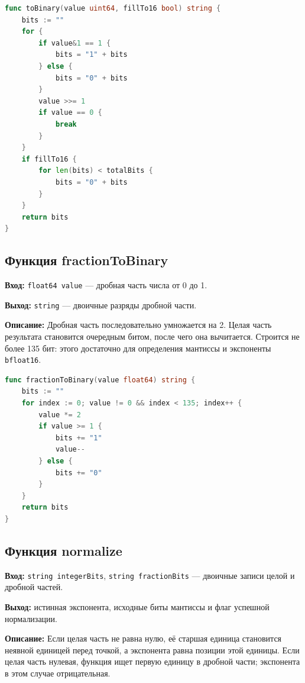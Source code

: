 \begin{lstlisting}[style=common, language=Go, caption=toBinary, label=lst:to-binary]
func toBinary(value uint64, fillTo16 bool) string {
    bits := ""
    for {
        if value&1 == 1 {
            bits = "1" + bits
        } else {
            bits = "0" + bits
        }
        value >>= 1
        if value == 0 {
            break
        }
    }
    if fillTo16 {
        for len(bits) < totalBits {
            bits = "0" + bits
        }
    }
    return bits
}
\end{lstlisting}

\subsection*{Функция fractionToBinary}
\textbf{Вход:} \texttt{float64 value} --- дробная часть числа от 0 до 1. \par
\textbf{Выход:} \texttt{string} --- двоичные разряды дробной части. \par
\textbf{Описание:} Дробная часть последовательно умножается на 2. Целая
часть результата становится очередным битом, после чего она вычитается.
Строится не более 135 бит: этого достаточно для определения мантиссы и
экспоненты \texttt{bfloat16}.

\begin{lstlisting}[style=common, language=Go, caption=fractionToBinary, label=lst:fraction-to-binary]
func fractionToBinary(value float64) string {
    bits := ""
    for index := 0; value != 0 && index < 135; index++ {
        value *= 2
        if value >= 1 {
            bits += "1"
            value--
        } else {
            bits += "0"
        }
    }
    return bits
}
\end{lstlisting}

\subsection*{Функция normalize}
\textbf{Вход:} \texttt{string integerBits}, \texttt{string fractionBits} ---
двоичные записи целой и дробной частей. \par
\textbf{Выход:} истинная экспонента, исходные биты мантиссы и флаг успешной
нормализации. \par
\textbf{Описание:} Если целая часть не равна нулю, её старшая единица становится
неявной единицей перед точкой, а экспонента равна позиции этой единицы.
Если целая часть нулевая, функция ищет первую единицу в дробной части;
экспонента в этом случае отрицательная.

